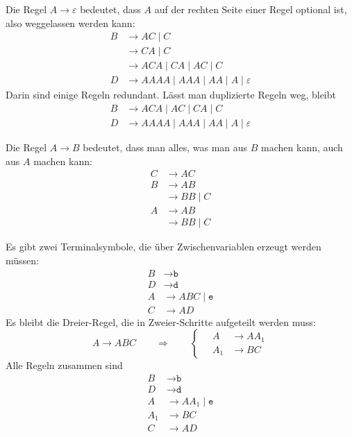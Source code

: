 \begin{loesung}
\begin{teilaufgaben}
\item
Die Regel $A\to\varepsilon$ bedeutet, dass $A$ auf der rechten Seite
einer Regel optional ist, also weggelassen werden kann:
\begin{align*}
B&\to AC \mid C     \\
 &\to CA \mid C     \\
 &\to ACA \mid CA \mid AC \mid C    \\
D&\to AAAA \mid AAA \mid AA \mid A \mid \varepsilon
\end{align*}
Darin sind einige Regeln redundant. 
Lässt man duplizierte Regeln weg, bleibt
\begin{align*}
B&\to ACA \mid AC \mid CA \mid C \\
D&\to AAAA \mid AAA \mid AA \mid A \mid \varepsilon
\end{align*}
\item
Die Regel $A\to B$ bedeutet, dass man alles, was man aus $B$ machen kann,
auch aus $A$ machen kann:
\begin{align*}
C &\to AC     \\
B &\to AB     \\
  &\to BB \mid C  \\
A &\to AB     \\
  &\to BB \mid C 
\end{align*}
\item
Es gibt zwei Terminalsymbole, die über Zwischenvariablen erzeugt
werden müssen:
\begin{align*}
B & \to \texttt{b} \\
D & \to \texttt{d} \\
A&\to ABC \mid \texttt{e} \\
C&\to AD
\end{align*}
Es bleibt die Dreier-Regel, die in Zweier-Schritte aufgeteilt werden
muss:
\[
A\to ABC
\qquad\Rightarrow\qquad
\left\{\quad
\begin{aligned}
A&\to AA_1 \\
A_1&\to BC
\end{aligned}
\right.
\]
Alle Regeln zusammen sind
\begin{align*}
B & \to \texttt{b} \\
D & \to \texttt{d} \\
A&\to AA_1 \mid \texttt{e} \\
A_1&\to BC \\
C&\to AD
\end{align*}

\end{teilaufgaben}
\end{loesung}
